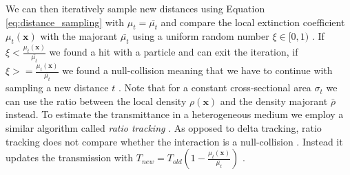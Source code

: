 We can then iteratively sample new distances using Equation \ref{eq:distance_sampling} with $\mu_t=\bar{\mu_t}$ and compare the local extinction coefficient $\mu_t(\boldsymbol{x})$ with the majorant $\bar{\mu_t}$ using a uniform random number $\xi\in[0,1)$ \cite{spectral_and_decomposition_tracking}.
If $\xi<\frac{\mu_t(\boldsymbol{x})}{\bar{\mu_t}}$ we found a hit with a particle and can exit the iteration, if $\xi>=\frac{\mu_t(\boldsymbol{x})}{\bar{\mu_t}}$ we found a null-collision meaning that we have to continue with sampling a new distance $t$ \cite{spectral_and_decomposition_tracking}.
Note that for a constant cross-sectional area $\sigma_t$ we can use the ratio between the local density $\rho(\boldsymbol{x})$ and the density majorant $\bar{\rho}$ instead.
To estimate the transmittance in a heterogeneous medium we employ a similar algorithm called \textit{ratio tracking} \cite{novak_ratio_tracking}.
As opposed to delta tracking, ratio tracking does not compare whether the interaction is a null-collision \cite{novak_ratio_tracking}.
Instead it updates the transmission with $T_{new} = T_{old}(1 - \frac{\mu_t(\boldsymbol{x})}{\bar{\mu_t}})$ \cite{novak_ratio_tracking}.

